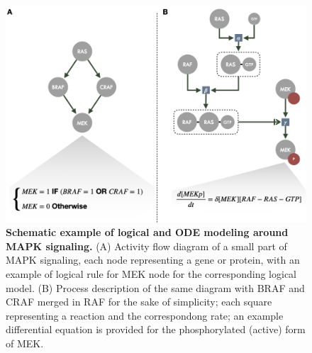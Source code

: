 \documentclass[a4paper,12pt,twoside,onecolumn,openright,final,oldfontcommands]{memoir}
\begin{document}
\begin{figure}

{\centering \includegraphics[width=0.9\linewidth]{fig/toyraf} 

}

\caption[Schematic example of logical and ODE modeling around MAPK signaling]{\textbf{Schematic example of logical and ODE
modeling around MAPK signaling.} (A) Activity flow diagram of a small
part of MAPK signaling, each node representing a gene or protein, with
an example of logical rule for MEK node for the corresponding logical
model. (B) Process description of the same diagram with BRAF and CRAF
merged in RAF for the sake of simplicity; each square representing a
reaction and the correspondong rate; an example differential equation is
provided for the phosphorylated (active) form of MEK.}\label{fig:toyraf}
\end{figure}
\end{document}
